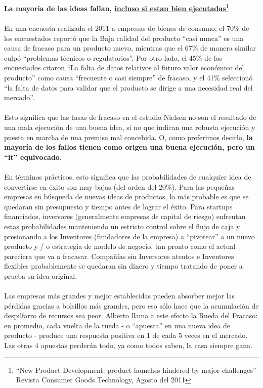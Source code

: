 \documentclass{article}
\begin{document}
\\ \\
\textbf{La mayoria de las ideas fallan, \underline{incluso si estan bien ejecutadas}}\footnote{``New Product Development: product launches hindered by major challenges'' Revista Consumer Goods Technology, Agosto del 2011}
\\ \\
En una encuesta realizada el 2011 a empresas de bienes de consumo, el 70\% de los encuestados report\'o que la Baja calidad del producto ``casi nunca'' es una causa de fracaso para un producto nuevo, mientras que el 67\% de manera similar culp\'o ``problemas t\'ecnicos o regulatorios''. Por otro lado, el 45\% de los encuestados citaron ``La falta de datos relativos al futuro valor econ\'omico del producto'' como causa ``frecuente o casi siempre'' de fracaso, y el 41\% seleccion\'o ``la falta de datos para validar que el producto se dirige a una necesidad real del mercado''.
\\ \\
Esto significa que las tasas de fracaso en el estudio Nielsen no son el resultado de una mala ejecuci\'on de una buena idea, si no que indican una robusta ejecuci\'on y puesta en marcha de una premisa mal concebida. O, como preferimos decirlo, \textbf{la mayor\'ia de los fallos tienen como origen una buena ejecuci\'on, pero un ``it'' equivocado.}
\\ \\
En t\'erminos pr\'acticos, esto significa que las probabilidades de cualquier idea de convertirse en \'exito son muy bajas (del orden del 20\%). Para las peque\~nas empresas en b\'usqueda de nuevas ideas de productos, lo m\'as probable es que se quedaran sin presupuesto y tiempo antes de lograr el \'exito. Para startups financiados, inversores (generalmente empresas de capital de riesgo) enfrentan estas probabilidades manteniendo un estricto control sobre el flujo de caja y presionando a los Inventores (fundadores de la empresa) a ``pivotear'' a un nuevo producto y / o estrategia de modelo de negocio, tan pronto como el actual pareciera que va a fracasar. Compa\~n\'ias sin Inversores atentos e Inventores flexibles probablemente se quedaran sin dinero y tiempo tratando de poner a prueba su idea original.
\\ \\
Las empresas m\'as grandes y mejor establecidas pueden absorber mejor las p\'erdidas gracias a bolsillos m\'as grandes, pero eso s\'olo hace que la acumulaci\'on de despilfarro de recursos sea peor. Alberto llama a este efecto la Rueda del Fracaso: en promedio, cada vuelta de la rueda - o ``apuesta'' en una nueva idea de producto - produce una respuesta positiva en 1 de cada 5 veces en el mercado. Las otras 4 apuestas perder\'an todo, ya como todos saben, la casa siempre gana.
\end{document}
